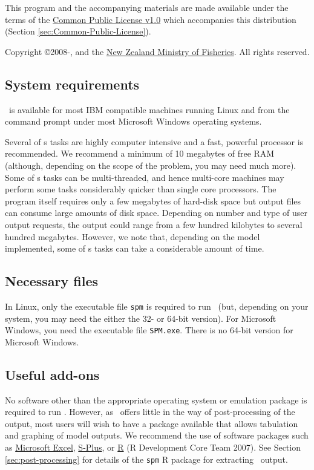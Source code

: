 This program and the accompanying materials are made available under the terms of the \href{http://www.opensource.org/licenses/cpl1.0.php}{Common Public License v1.0} which accompanies this distribution (Section \ref{sec:Common-Public-License}).

Copyright \copyright 2008-\SourceControlYearDoc, \href{http://www.niwa.co.nz}{\Organisation} and the \href{http://www.fish.govt.nz}{New Zealand Ministry of Fisheries}. All rights reserved.

\subsection{System requirements}

\SPM\ is available for most IBM compatible machines running Linux and from the command prompt under most Microsoft Windows operating systems.

Several of \SPM s tasks are highly computer intensive and a fast, powerful processor is recommended. We recommend a minimum of 10 megabytes of free RAM (although, depending on the scope of the problem, you may need much more). Some of \SPM s tasks can be multi-threaded, and hence multi-core machines may perform some tasks considerably quicker than single core processors. The program itself requires only a few megabytes of hard-disk space but output files can consume large amounts of disk space. Depending on number and type of user output requests, the output could range from a few hundred kilobytes to several hundred megabytes. However, we note that, depending on the model implemented, some of \SPM s tasks can take a considerable amount of time.

\subsection{Necessary files}

In Linux, only the executable file \texttt{spm} is required to run \SPM\ (but, depending on your system, you may need the either the 32- or 64-bit version). For Microsoft Windows, you need the executable file \texttt{SPM.exe}. There is no 64-bit version for Microsoft Windows.

\subsection{Useful add-ons}

No software other than the appropriate operating system or emulation package is required to run \SPM. However, as \SPM\ offers little in the way of  post-processing of the output, most users will wish to have a package available that allows tabulation and graphing of model outputs. We recommend the use of software packages such as \href{http://www.microsoft.com}{Microsoft Excel}, \href{http://www.insightful.com}{S-Plus}, or \href{http://www.r-project.org}{R} (R Development Core Team 2007). See Section \ref{sec:post-processing} for details of the \texttt{spm} R package for extracting \SPM\ output.

